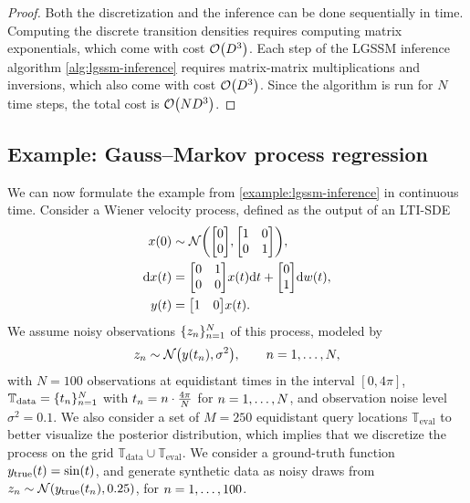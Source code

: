 \documentclass{mimosis}
\begin{document}
\begin{proof}
Both the discretization and the inference can be done sequentially in time.
Computing the discrete transition densities requires computing matrix exponentials, which come with cost \(\order{D^3}\).
Each step of the LGSSM inference algorithm
\ref{alg:lgssm-inference}
requires matrix-matrix multiplications and inversions, which also come with cost \(\order{D^3}\).
Since the algorithm is run for \(N\) time steps, the total cost is \(\order{N D^3}\).
\end{proof}
\subsection{Example: Gauss--Markov process regression}
\label{sec:org8233413}
\label{example:gmp-regression}

We can now formulate the example from \cref{example:lgssm-inference} in continuous time.
Consider a Wiener velocity process, defined as the output of an LTI-SDE
\begin{subequations}
\begin{align}
\st(0) &\sim \N(\mqty[0 \\ 0], \mqty[1 & 0 \\ 0 & 1]), \\
\dd \st(t) &= \mqty[0 & 1 \\ 0 & 0] \st(t) \dd t + \mqty[0 \\ 1] \dd \wiener(t), \\
\val(t) &= \mqty[1 & 0] \st(t).
\end{align}
\end{subequations}
We assume noisy observations \(\{z_n\}_{n=1}^N\) of this process, modeled by
\begin{equation}
\sobs_\idxt \sim \N( \val(t_\idxt), \sigma^2 ), \qquad \idxt = 1, \dots, N,
\end{equation}
with \(N=100\) observations at equidistant times
in the interval \([0, 4\pi]\),
\(\mathbb{T}_\text{data} = \{t_n\}_{n=1}^N\) with
\(t_n = n \cdot \frac{4\pi}{N}\) for \(n=1, \dots, N\),
and observation noise level \(\sigma^2 = 0.1\).
We also consider a set of \(M=250\) equidistant query locations
\(\mathbb{T}_\text{eval}\) to better visualize the posterior distribution,
which implies that we discretize the process on the grid \(\mathbb{T}_\text{data} \cup \mathbb{T}_\text{eval}\).
We consider a ground-truth function \(y_\text{true}(t) = \sin(t)\), and generate synthetic data as noisy draws from \(\obs_\idxt \sim \N(\val_\text{true}(t_\idxt), 0.25)\), for \(n=1, \dots, 100\).
\end{document}
